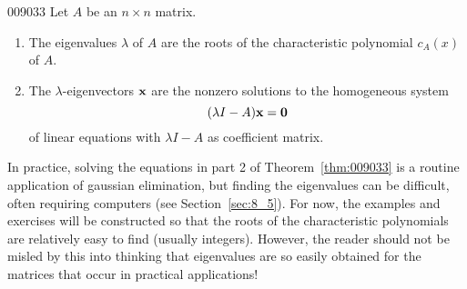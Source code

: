\begin{theorem}{}{009033}
Let $A$ be an $n \times n$ matrix.

\begin{enumerate}
\item The eigenvalues $\lambda$ of $A$ are the roots of the characteristic polynomial $c_{A}(x)$ of $A$.

\item The $\lambda$-eigenvectors $\textbf{x}$ are the nonzero solutions to the homogeneous system
\begin{equation*}
(\lambda I - A)\textbf{x} = \textbf{0}
\end{equation*}
of linear equations with $\lambda I - A$ as coefficient matrix.

\end{enumerate}
\end{theorem}

\noindent In practice, solving the equations in part 2 of Theorem~\ref{thm:009033} is a routine application of gaussian elimination, but finding the eigenvalues can be difficult, often requiring computers (see Section~\ref{sec:8_5}).
 For now, the examples and exercises will be constructed so that the 
roots of the characteristic polynomials are relatively easy to find 
(usually integers). However, the reader should not be misled by this 
into thinking that eigenvalues are so easily obtained for the matrices 
that occur in practical applications!


